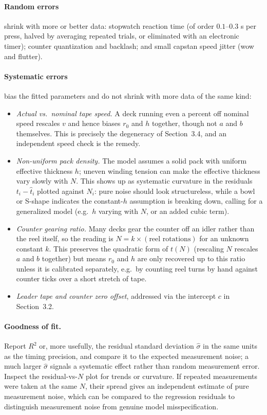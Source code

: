 \documentclass[12pt,oneside,a4paper]{article}
\begin{document}
\paragraph{Random errors} shrink with more or better data:
stopwatch reaction time (of order $0.1$--$0.3$ s per press, halved by
averaging repeated trials, or eliminated with an electronic timer);
counter quantization and backlash; and small capstan speed jitter
(wow and flutter).

\paragraph{Systematic errors} bias the fitted parameters and do not
shrink with more data of the same kind:
\begin{itemize}
\item \emph{Actual vs.\ nominal tape speed.} A deck running even a
  percent off nominal speed rescales $v$ and hence biases $r_0$ and
  $h$ together, though not $a$ and $b$ themselves. This is precisely
  the degeneracy of Section~3.4, and an independent speed check is
  the remedy.
\item \emph{Non-uniform pack density.} The model assumes a solid
  pack with uniform effective thickness $h$; uneven winding tension
  can make the effective thickness vary slowly with $N$. This shows
  up as systematic curvature in the residuals $t_i - \hat t_i$
  plotted against $N_i$: pure noise should look structureless, while
  a bowl or S-shape indicates the constant-$h$ assumption is
  breaking down, calling for a generalized model (e.g.\ $h$ varying
  with $N$, or an added cubic term).
\item \emph{Counter gearing ratio.} Many decks gear the counter off
  an idler rather than the reel itself, so the reading is
  $N = k \times (\text{reel rotations})$ for an unknown constant
  $k$. This preserves the quadratic form of $t(N)$ (rescaling $N$
  rescales $a$ and $b$ together) but means $r_0$ and $h$ are only
  recovered up to this ratio unless it is calibrated separately,
  e.g.\ by counting reel turns by hand against counter ticks over a
  short stretch of tape.
\item \emph{Leader tape and counter zero offset}, addressed via the
  intercept $c$ in Section~3.2.
\end{itemize}

\paragraph{Goodness of fit.} Report $R^2$ or, more usefully, the
residual standard deviation $\hat\sigma$ in the same units as the
timing precision, and compare it to the expected measurement noise;
a much larger $\hat\sigma$ signals a systematic effect rather than
random measurement error. Inspect the residual-vs-$N$ plot for
trends or curvature. If repeated measurements were taken at the same
$N$, their spread gives an independent estimate of pure measurement
noise, which can be compared to the regression residuals to
distinguish measurement noise from genuine model misspecification.
\end{document}
